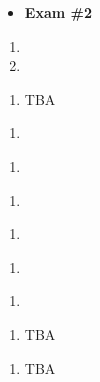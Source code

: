 \documentclass{article}
\begin{document}
\week{}
\dia{}
\Review{}
\dia{}
\begin{itemize}
\item[ ] \textbf{Exam \#2}
\end{itemize}



\dia{}
\begin{enumerate}
\item {}
\item {}
\end{enumerate}

\dia{}
\begin{enumerate}
\item TBA
\end{enumerate}


\dia{}
\begin{enumerate}
\item {}%
\end{enumerate}

\dia{}
\begin{enumerate}
\item {}
\end{enumerate}



\dia{}
\begin{enumerate}
\item {}
\end{enumerate}

\dia{}
\begin{enumerate}
\item {}
\end{enumerate}


\dia{}
\begin{enumerate}
\item {}
\end{enumerate}

\dia{}
\begin{enumerate}
\item {}
\end{enumerate}


\dia{}
\begin{enumerate}
\item TBA
\end{enumerate}

\dia{} 
\begin{enumerate}
\item TBA
\end{enumerate}

\week{}
\dia{}
\Review{}
\end{document}
